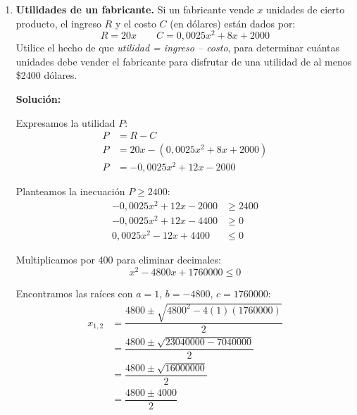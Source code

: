 \documentclass[12pt]{article}
\newcommand{\solucion}{%
    \vspace{0.8em}%
    \textbf{Solución:}%
}
\begin{document}
\begin{enumerate}[label=\alph*.-]
    Queremos que el Plan 1 sea más económico que el Plan 2:
    \begin{align*}
    5000 + 50x &< 3000 + 75x \\[0.3em]
    5000 - 3000 &< 75x - 50x \\[0.3em]
    2000 &< 25x \\[0.3em]
    80 &< x
    \end{align*}

    El conjunto solución es:
    \[
    \boxed{CS = (80,\ +\infty)}
    \]

    Para que la primera propuesta sea más económica, se deben trabajar \textbf{más de 80 horas}.

    \item \textbf{Utilidades de un fabricante.} Si un fabricante vende $x$ unidades de cierto producto, el ingreso $R$ y el costo $C$ (en dólares) están dados por:
    \[R = 20x \qquad C = 0{,}0025x^2 + 8x + 2000\]
    Utilice el hecho de que \textit{utilidad = ingreso -- costo}, para determinar cuántas unidades debe vender el fabricante para disfrutar de una utilidad de al menos \$2400 dólares.

    \solucion

    Expresamos la utilidad $P$:
    \begin{align*}
    P &= R - C \\[0.3em]
    P &= 20x - (0{,}0025x^2 + 8x + 2000) \\[0.3em]
    P &= -0{,}0025x^2 + 12x - 2000
    \end{align*}

    Planteamos la inecuación $P \geq 2400$:
    \begin{align*}
    -0{,}0025x^2 + 12x - 2000 &\geq 2400 \\[0.3em]
    -0{,}0025x^2 + 12x - 4400 &\geq 0 \\[0.3em]
    0{,}0025x^2 - 12x + 4400 &\leq 0
    \end{align*}

    Multiplicamos por 400 para eliminar decimales:
    \[
    x^2 - 4800x + 1760000 \leq 0
    \]

    Encontramos las raíces con $a = 1$, $b = -4800$, $c = 1760000$:
    \begin{align*}
    x_{1,2} &= \dfrac{4800 \pm \sqrt{4800^2 - 4(1)(1760000)}}{2} \\[0.3em]
    &= \dfrac{4800 \pm \sqrt{23040000 - 7040000}}{2} \\[0.3em]
    &= \dfrac{4800 \pm \sqrt{16000000}}{2} \\[0.3em]
    &= \dfrac{4800 \pm 4000}{2}
    \end{align*}


\end{enumerate}
\end{document}
